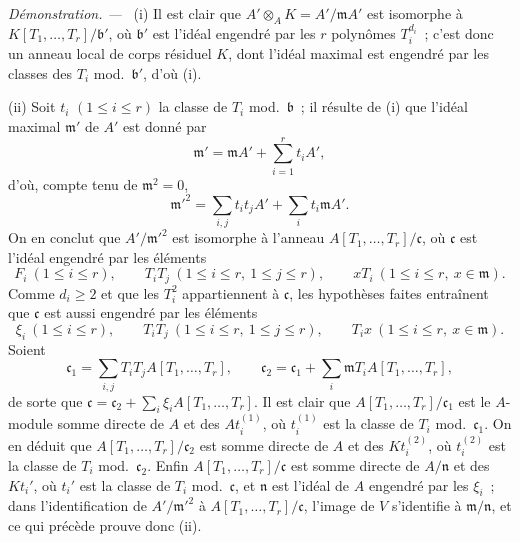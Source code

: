 \documentclass[10pt,oneside]{book}
\newenvironment{proof}{%
  \par\medskip\noindent\textit{Démonstration. ---\ }}{\par}
\begin{document}
\begin{proof}
(i) Il est clair que $A'\otimes_AK=A'/\mathfrak mA'$ est isomorphe à
$K[T_1,\ldots,T_r]/\mathfrak b'$, où $\mathfrak b'$ est l'idéal engendré
par les $r$ polynômes $T_i^{d_i}$~; c'est donc un anneau local de corps
résiduel $K$, dont l'idéal maximal est engendré par les classes des $T_i$
mod.~$\mathfrak b'$, d'où (i).

(ii) Soit $t_i$ $(1\leqslant i\leqslant r)$ la classe de $T_i$
mod.~$\mathfrak b$~; il résulte de (i) que l'idéal maximal $\mathfrak m'$ de
$A'$ est donné par
\[
  \mathfrak m'=\mathfrak mA'+\sum_{i=1}^r t_iA',
\]
d'où, compte tenu de $\mathfrak m^2=0$,
\[
  \mathfrak m'^2=\sum_{i,j}t_it_jA'+\sum_i t_i\mathfrak mA'.
\]
On en conclut que $A'/\mathfrak m'^2$ est isomorphe à l'anneau
$A[T_1,\ldots,T_r]/\mathfrak c$, où $\mathfrak c$ est l'idéal engendré par
les éléments
\[
  F_i\ (1\leqslant i\leqslant r),\qquad
  T_iT_j\ (1\leqslant i\leqslant r,\ 1\leqslant j\leqslant r),\qquad
  xT_i\ (1\leqslant i\leqslant r,\ x\in\mathfrak m).
\]
Comme $d_i\geqslant2$ et que les $T_i^2$ appartiennent à
$\mathfrak c$, les hypothèses faites entraînent que $\mathfrak c$ est aussi
engendré par les éléments
\[
  \xi_i\ (1\leqslant i\leqslant r),\qquad
  T_iT_j\ (1\leqslant i\leqslant r,\ 1\leqslant j\leqslant r),\qquad
  T_ix\ (1\leqslant i\leqslant r,\ x\in\mathfrak m).
\]
Soient
\[
  \mathfrak c_1=\sum_{i,j}T_iT_jA[T_1,\ldots,T_r],\qquad
  \mathfrak c_2=\mathfrak c_1+\sum_i\mathfrak mT_iA[T_1,\ldots,T_r],
\]
de sorte que
$\mathfrak c=\mathfrak c_2+\sum_i\xi_iA[T_1,\ldots,T_r]$. Il est clair que
$A[T_1,\ldots,T_r]/\mathfrak c_1$ est le $A$-module somme directe de $A$ et
des $At_i^{(1)}$, où $t_i^{(1)}$ est la classe de $T_i$
mod.~$\mathfrak c_1$. On en déduit que
$A[T_1,\ldots,T_r]/\mathfrak c_2$ est somme directe de $A$ et des
$Kt_i^{(2)}$, où $t_i^{(2)}$ est la classe de $T_i$
mod.~$\mathfrak c_2$. Enfin $A[T_1,\ldots,T_r]/\mathfrak c$ est somme
directe de $A/\mathfrak n$ et des $Kt_i'$, où $t_i'$ est la classe de $T_i$
mod.~$\mathfrak c$, et $\mathfrak n$ est l'idéal de $A$ engendré par les
$\xi_i$~; dans l'identification de $A'/\mathfrak m'^2$ à
$A[T_1,\ldots,T_r]/\mathfrak c$, l'image de $V$ s'identifie à
$\mathfrak m/\mathfrak n$, et ce qui précède prouve donc (ii).
\end{proof}
\end{document}
